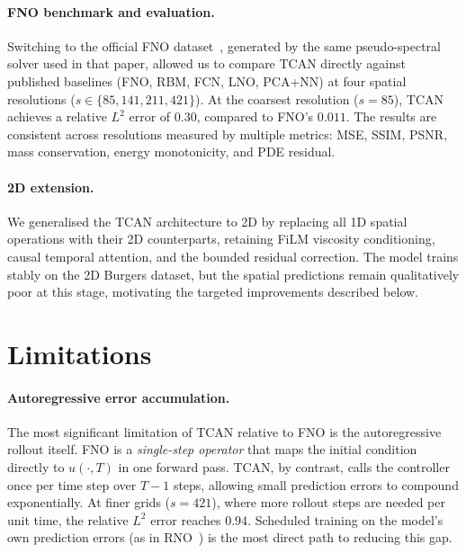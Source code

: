 \paragraph{FNO benchmark and evaluation.}
Switching to the official FNO dataset~\cite{li2021fourier}, generated by the same pseudo-spectral solver used in that paper, allowed us to compare TCAN directly against published baselines (FNO, RBM, FCN, LNO, PCA+NN) at four spatial resolutions ($s \in \{85, 141, 211, 421\}$). At the coarsest resolution ($s=85$), TCAN achieves a relative $L^2$ error of $0.30$, compared to FNO's $0.011$. The results are consistent across resolutions measured by multiple metrics: MSE, SSIM, PSNR, mass conservation, energy monotonicity, and PDE residual.

\paragraph{2D extension.}
We generalised the TCAN architecture to 2D by replacing all 1D spatial operations with their 2D counterparts, retaining FiLM viscosity conditioning, causal temporal attention, and the bounded residual correction. The model trains stably on the 2D Burgers dataset, but the spatial predictions remain qualitatively poor at this stage, motivating the targeted improvements described below.

\section{Limitations}
\label{sec:conclusion_limitations}

\paragraph{Autoregressive error accumulation.}
The most significant limitation of TCAN relative to FNO is the autoregressive rollout itself. FNO is a \emph{single-step operator} that maps the initial condition directly to $u(\cdot, T)$ in one forward pass. TCAN, by contrast, calls the controller once per time step over $T-1$ steps, allowing small prediction errors to compound exponentially. At finer grids ($s=421$), where more rollout steps are needed per unit time, the relative $L^2$ error reaches $0.94$. Scheduled training on the model's own prediction errors (as in RNO~\cite{lippe2023pderefiner}) is the most direct path to reducing this gap.

